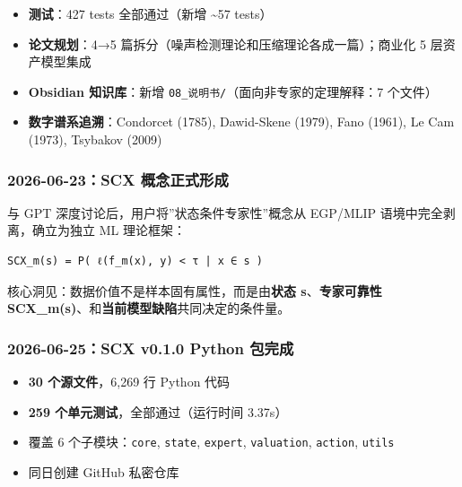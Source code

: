 \documentclass[
  12pt,
]{ctexart}
\providecommand{\tightlist}{%
  \setlength{\itemsep}{0pt}\setlength{\parskip}{0pt}}
\begin{document}
\begin{itemize}
  \begin{itemize}
  \tightlist
  \item
    \texttt{src/scx/valuation/state\_value.py} --- 添加 theorem-based
    方法：noise\_consistency\_score, optimal\_noise\_threshold,
    noise\_detection\_f1\_bound, chernoff\_bound, hoeffding\_bound,
    feature\_strength\_diagnostic；旧 V(s) 方法标记 deprecated
  \item
    \texttt{src/scx/yajie.py} --- 新模块（雅洁：优雅的数据清理器）
  \item
    \texttt{tests/test\_yajie.py} --- 新测试文件
  \end{itemize}
\item
  \textbf{测试}：427 tests 全部通过（新增 \textasciitilde57 tests）
\item
  \textbf{论文规划}：4→5
  篇拆分（噪声检测理论和压缩理论各成一篇）；商业化 5 层资产模型集成
\item
  \textbf{Obsidian 知识库}：新增
  \texttt{08\_说明书/}（面向非专家的定理解释：7 个文件）
\item
  \textbf{数字谱系追溯}：Condorcet (1785), Dawid-Skene (1979), Fano
  (1961), Le Cam (1973), Tsybakov (2009)
\end{itemize}

\subsubsection{2026-06-23：SCX
概念正式形成}\label{scx-ux6982ux5ff5ux6b63ux5f0fux5f62ux6210}

与 GPT 深度讨论后，用户将''状态条件专家性''概念从 EGP/MLIP
语境中完全剥离，确立为独立 ML 理论框架：

\begin{verbatim}
SCX_m(s) = P( ℓ(f_m(x), y) < τ | x ∈ s )
\end{verbatim}

核心洞见：数据价值不是样本固有属性，而是由\textbf{状态
s}、\textbf{专家可靠性
SCX\_m(s)}、和\textbf{当前模型缺陷}共同决定的条件量。

\subsubsection{2026-06-25：SCX v0.1.0 Python
包完成}\label{scx-v0.1.0-python-ux5305ux5b8cux6210}

\begin{itemize}
\tightlist
\item
  \textbf{30 个源文件}，6,269 行 Python 代码
\item
  \textbf{259 个单元测试}，全部通过（运行时间 3.37s）
\item
  覆盖 6 个子模块：\texttt{core}, \texttt{state}, \texttt{expert},
  \texttt{valuation}, \texttt{action}, \texttt{utils}
\item
  同日创建 GitHub 私密仓库
\end{itemize}
\end{document}
